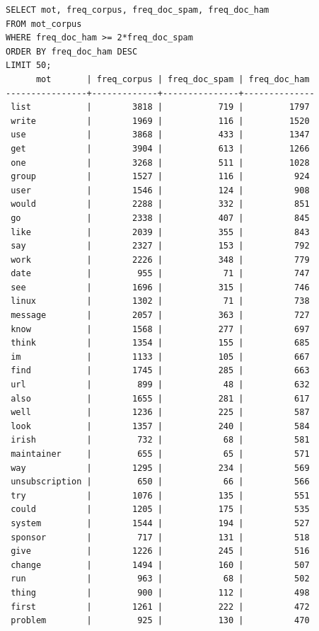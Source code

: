 \documentclass[a4paper,12pt]{article}
\begin{document}
	\begin{verbatim}
SELECT mot, freq_corpus, freq_doc_spam, freq_doc_ham
FROM mot_corpus
WHERE freq_doc_ham >= 2*freq_doc_spam
ORDER BY freq_doc_ham DESC
LIMIT 50;
      mot       | freq_corpus | freq_doc_spam | freq_doc_ham 
----------------+-------------+---------------+--------------
 list           |        3818 |           719 |         1797
 write          |        1969 |           116 |         1520
 use            |        3868 |           433 |         1347
 get            |        3904 |           613 |         1266
 one            |        3268 |           511 |         1028
 group          |        1527 |           116 |          924
 user           |        1546 |           124 |          908
 would          |        2288 |           332 |          851
 go             |        2338 |           407 |          845
 like           |        2039 |           355 |          843
 say            |        2327 |           153 |          792
 work           |        2226 |           348 |          779
 date           |         955 |            71 |          747
 see            |        1696 |           315 |          746
 linux          |        1302 |            71 |          738
 message        |        2057 |           363 |          727
 know           |        1568 |           277 |          697
 think          |        1354 |           155 |          685
 im             |        1133 |           105 |          667
 find           |        1745 |           285 |          663
 url            |         899 |            48 |          632
 also           |        1655 |           281 |          617
 well           |        1236 |           225 |          587
 look           |        1357 |           240 |          584
 irish          |         732 |            68 |          581
 maintainer     |         655 |            65 |          571
 way            |        1295 |           234 |          569
 unsubscription |         650 |            66 |          566
 try            |        1076 |           135 |          551
 could          |        1205 |           175 |          535
 system         |        1544 |           194 |          527
 sponsor        |         717 |           131 |          518
 give           |        1226 |           245 |          516
 change         |        1494 |           160 |          507
 run            |         963 |            68 |          502
 thing          |         900 |           112 |          498
 first          |        1261 |           222 |          472
 problem        |         925 |           130 |          470

\end{verbatim}
\end{document}
